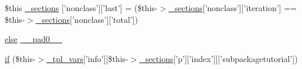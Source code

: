 \begin{DoxyCompactItemize}
\item 
\$this \hyperlink{_06_06-72_05_06_06-727729411_05left__frame_8tpl_8php_a6535412454fb0778a46a668168f7e71d}{\-\_\-sections} \mbox{[}'nonclass'\mbox{]}\mbox{[}'last'\mbox{]} = (\$this-\/$>$\hyperlink{_06_06127_05_06_0612781687_05pkgelementindex_8tpl_8php_a9e3d26b39edfe29c3f29b8035ef33828}{\-\_\-sections}\mbox{[}'nonclass'\mbox{]}\mbox{[}'iteration'\mbox{]} == \$this-\/$>$\hyperlink{_06_06127_05_06_0612781687_05pkgelementindex_8tpl_8php_a9e3d26b39edfe29c3f29b8035ef33828}{\-\_\-sections}\mbox{[}'nonclass'\mbox{]}\mbox{[}'total'\mbox{]})
\item 
\hyperlink{test__session_8php_a7ca5c3b9e4c46ab37c0418e95ddcfa36}{else} \hyperlink{_06_06-72_05_06_06-727729411_05left__frame_8tpl_8php_a8e01dcc96c43199448ee66f7c2ae8ea6}{\-\_\-\-\_\-pad0\-\_\-\-\_\-}
\item 
\hyperlink{_06_06-72_05_06_06-727729411_05left__frame_8tpl_8php_a0caf84c94fd06ab1af243c37f2196497}{if} (\$this-\/$>$\hyperlink{_06_06127_05_06_0612781687_05pkgelementindex_8tpl_8php_a4a4846d8e68d455590131a05697f67a3}{\-\_\-tpl\-\_\-vars}\mbox{[}'info'\mbox{]}\mbox{[}\$this-\/$>$\hyperlink{_06_06127_05_06_0612781687_05pkgelementindex_8tpl_8php_a9e3d26b39edfe29c3f29b8035ef33828}{\-\_\-sections}\mbox{[}'p'\mbox{]}\mbox{[}'index'\mbox{]}\mbox{]}\mbox{[}'subpackagetutorial'\mbox{]})
\end{DoxyCompactItemize}


